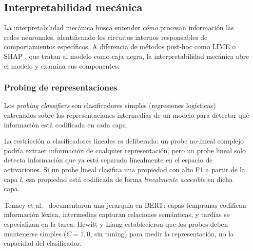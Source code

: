 \subsection{Interpretabilidad mecánica}
\label{sec:sota-interpretabilidad}

La interpretabilidad mecánica busca entender \emph{cómo} procesan información las
redes neuronales, identificando los circuitos internos responsables de
comportamientos específicos. A diferencia de métodos post-hoc como LIME
\cite{ribeiro2016should} o SHAP \cite{lundberg2017unified}, que tratan al modelo
como caja negra, la interpretabilidad mecánica abre el modelo y examina sus
componentes.

\subsubsection{Probing de representaciones}
\label{sec:sota-probing}

Los \textit{probing classifiers} \cite{conneau2018cram, hewitt2019structural} son
clasificadores simples (regresiones logísticas) entrenados sobre las representaciones
intermedias de un modelo para detectar qué información está codificada en cada capa.

La restricción a clasificadores lineales es deliberada: un probe no-lineal complejo
podría extraer información de cualquier representación, pero un probe lineal solo
detecta información que ya está separada linealmente en el espacio de activaciones.
Si un probe lineal clasifica una propiedad con alto F1 a partir de la capa $l$, esa
propiedad está codificada de forma \emph{linealmente accesible} en dicha capa.

Tenney et al.\ \cite{tenney2019bert} documentaron una jerarquía en BERT: capas
tempranas codifican información léxica, intermedias capturan relaciones semánticas,
y tardías se especializan en la tarea. Hewitt y Liang \cite{hewitt2019designing}
establecieron que los probes deben mantenerse simples ($C = 1{,}0$, sin tuning)
para medir la representación, no la capacidad del clasificador.

